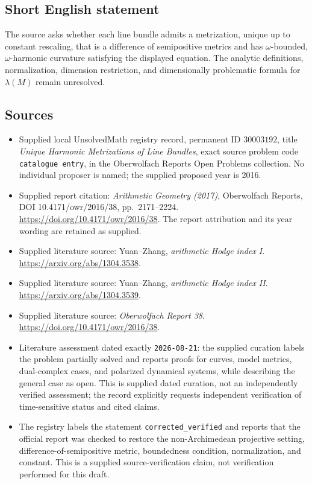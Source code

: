 \documentclass[11pt]{article}
\begin{document}
\subsection{Short English statement}
The source asks whether each line bundle admits a metrization, unique up to constant rescaling, that is a difference of semipositive metrics and has \(\omega\)-bounded, \(\omega\)-harmonic curvature satisfying the displayed equation. The analytic definitions, normalization, dimension restriction, and dimensionally problematic formula for \(\lambda(M)\) remain unresolved.
\subsection{Sources}
\begin{itemize}
\item Supplied local UnsolvedMath registry record, permanent ID \(30003192\), title \emph{Unique Harmonic Metrizations of Line Bundles}, exact source problem code \texttt{catalogue entry}, in the Oberwolfach Reports Open Problems collection. No individual proposer is named; the supplied proposed year is 2016.
\item Supplied report citation: \emph{Arithmetic Geometry (2017)}, Oberwolfach Reports, DOI 10.4171/owr/2016/38, pp.\ 2171--2224. \url{https://doi.org/10.4171/owr/2016/38}. The report attribution and its year wording are retained as supplied.
\item Supplied literature source: Yuan--Zhang, \emph{arithmetic Hodge index I}. \url{https://arxiv.org/abs/1304.3538}.
\item Supplied literature source: Yuan--Zhang, \emph{arithmetic Hodge index II}. \url{https://arxiv.org/abs/1304.3539}.
\item Supplied literature source: \emph{Oberwolfach Report 38}. \url{https://doi.org/10.4171/owr/2016/38}.
\item Literature assessment dated exactly \texttt{2026-08-21}: the supplied curation labels the problem partially solved and reports proofs for curves, model metrics, dual-complex cases, and polarized dynamical systems, while describing the general case as open. This is supplied dated curation, not an independently verified assessment; the record explicitly requests independent verification of time-sensitive status and cited claims.
\item The registry labels the statement \texttt{corrected\_verified} and reports that the official report was checked to restore the non-Archimedean projective setting, difference-of-semipositive metric, boundedness condition, normalization, and constant. This is a supplied source-verification claim, not verification performed for this draft.
\end{itemize}
\end{document}
